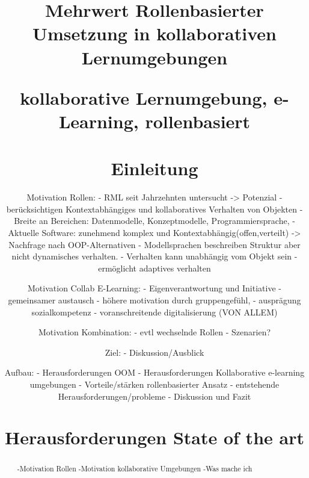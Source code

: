 \documentclass[conference]{IEEEtran}
\begin{document}
\title{Mehrwert Rollenbasierter Umsetzung in kollaborativen Lernumgebungen\\


\author{

}



\maketitle

\begin{abstract}
-Motivation Rollen 
-Motivation kollaborative Umgebungen
-Was mache ich

\end{abstract}

\begin{IEEEkeywords}
kollaborative Lernumgebung, e-Learning, rollenbasiert
\end{IEEEkeywords}

\section{Einleitung}
Motivation Rollen:
- RML seit Jahrzehnten untersucht -> Potenzial
- berücksichtigen Kontextabhängiges und kollaboratives Verhalten von Objekten
- Breite an Bereichen: Datenmodelle, Konzeptmodelle, Programmiersprache,
- Aktuelle Software: zunehmend komplex und Kontextabhängig(offen,verteilt) -> Nachfrage nach OOP-Alternativen
- Modellsprachen beschreiben Struktur aber nicht dynamisches verhalten.
- Verhalten kann unabhängig vom Objekt sein
- ermöglicht adaptives verhalten

Motivation  Collab E-Learning:
- Eigenverantwortung und Initiative
- gemeinsamer austausch
- höhere motivation durch gruppengefühl, 
- ausprägung sozialkompetenz
- voranschreitende digitalisierung (VON ALLEM) 

Motivation Kombination:
- evtl wechselnde Rollen
- Szenarien? 

Ziel:
- Diskussion/Ausblick

Aufbau:
- Herausforderungen OOM
- Herausforderungen Kollaborative e-learning umgebungen
- Vorteile/stärken rollenbasierter Ansatz
- entstehende Herausforderungen/probleme
- Diskussion und Fazit


\section{Herausforderungen State of the art}
}
\end{document}
